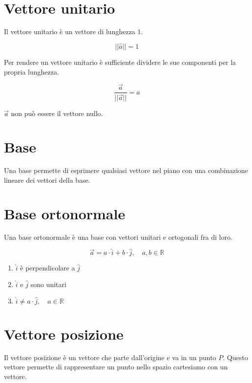 \documentclass{article}
\begin{document}
\section{Vettore unitario}

Il vettore unitario è un vettore di lunghezza \(1\).

\[
    ||\hat{a}|| = 1
\]

Per rendere un vettore unitario è sufficiente dividere le sue componenti per la propria lunghezza.

\[
    \frac{\vec{a}}{||\vec{a}||}=\hat{a}
\]

\(\vec{a}\) non può essere il vettore nullo.

\section{Base}

Una base permette di esprimere qualsiasi vettore nel piano con una combinazione lineare dei vettori della base.

\section{Base ortonormale}

Una base ortonormale è una base con vettori unitari e ortogonali fra di loro.

\[
    \vec{a} = a \cdot \hat{i} + b \cdot \hat{j},
    \quad a,b \in \mathbb{R}
\]

\begin{enumerate}
    \item \(\hat{i}\) è perpendicolare a \(\hat{j}\)
    \item \(\hat{i}\) e \(\hat{j}\) sono unitari
    \item \(\hat{i} \neq a\cdot\hat{j},\quad a\in \mathbb{R}\)  
\end{enumerate}

\section{Vettore posizione}

Il vettore posizione è un vettore che parte dall'origine e va in un punto \(P\).
Questo vettore permette di rappresentare un punto nello spazio cartesiamo con un vettore.

\pagebreak
\end{document}
